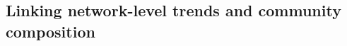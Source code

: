 \documentclass[12pt]{article}
\begin{document}
\begin{spacing}{1.5}




\subsection*{Linking network-level trends and community composition}


\end{spacing}
\end{document}

